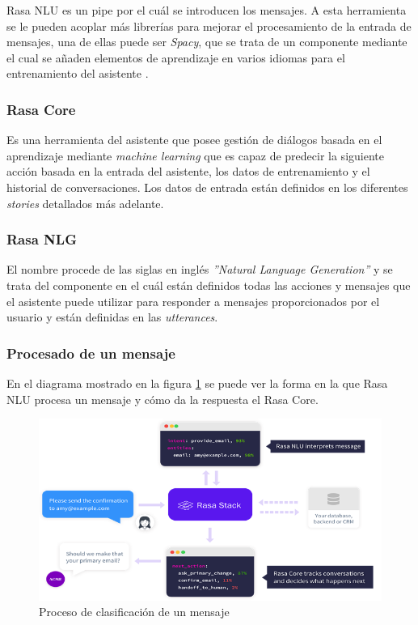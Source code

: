 Rasa NLU es un pipe por el cuál se introducen los mensajes. A esta herramienta se le pueden acoplar más librerías para mejorar el procesamiento de la entrada de mensajes, una de ellas puede ser \textit{Spacy}, que se trata de un componente mediante el cual se añaden elementos de aprendizaje en varios idiomas para el entrenamiento del asistente \cite{spacy}.

\subsubsection{Rasa Core}
Es una herramienta del asistente que posee gestión de diálogos basada en el aprendizaje mediante \textit{machine learning} que  es capaz de predecir la siguiente acción basada en la entrada del asistente, los datos de entrenamiento y el historial de conversaciones. Los datos de entrada están definidos en los diferentes \textit{stories} detallados más adelante.

\subsubsection{Rasa NLG}
El nombre procede de las siglas en inglés \textit{''Natural Language Generation''} y se trata del componente en el cuál están definidos todas las acciones y mensajes que el asistente puede utilizar para responder a mensajes proporcionados por el usuario y están definidas en las \textit{utterances}.

\subsubsection{Procesado de un mensaje}
En el diagrama mostrado en la figura \ref{fig:rasa_flowchart} se puede ver la forma en la que Rasa NLU procesa un mensaje y cómo da la respuesta el Rasa Core.

\begin{figure}[H]
    \centering
    \includegraphics[width=\textwidth]{include/capturas/rasaFlowchart.png}
    \caption{Proceso de clasificación de un mensaje}
    \label{fig:rasa_flowchart}
\end{figure}

